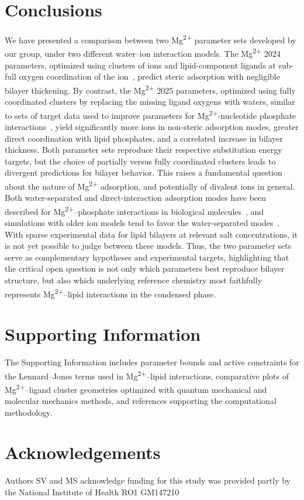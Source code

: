 \documentclass[journal=langd5,manuscript=article]{achemso}
\newcommand{\mg}{Mg\textsuperscript{2+}}
\begin{document}
\section{Conclusions}
We have presented a comparison between
two \mg{} parameter sets developed by our
group, under two different water–ion
interaction models. The \mg{ 2024}
parameters, optimized using clusters of
ions and lipid-component ligands at
sub-full oxygen coordination of the
ion~\cite{saunders:2024}, predict steric
adsorption with negligible bilayer
thickening. By contrast, the \mg{ 2025}
parameters, optimized using fully
coordinated clusters by replacing the
missing ligand oxygens with
waters, similar to sets of target data used to improve parameters for \mg{-nucleotide} phosphate interactions~\cite{julian:2023:mg}, yield
significantly more ions in non-steric
adsorption modes, greater direct
coordination with lipid phosphates, and a
correlated increase in bilayer thickness.
Both parameter sets reproduce their
respective substitution energy targets,
but the choice of partially versus fully
coordinated clusters leads to divergent
predictions for bilayer behavior.
 This raises a fundamental question about the nature of
\mg{} adsorption, and potentially of
divalent ions in general. Both
water-separated and direct-interaction
adsorption modes have been described for
\mg{}–phosphate interactions in biological
molecules~\cite{grotz:thesis,micro,grotz:2021:optimized,
villaparams,dudev:2003,rulivsek:2003:outer,
porschke:1979:mode,bowman:2012,fingerhut:2021:contact},
and simulations with older ion models tend
to favor the water-separated
modes~\cite{grotz:thesis,micro,grotz:2021:optimized,
villaparams,puyo:2022:consistent}. With
sparse experimental data for lipid bilayers
at relevant salt concentrations, it is not
yet possible to judge between these models.
Thus, the two parameter sets serve as
complementary hypotheses and experimental
targets, highlighting that the critical open
question is not only which parameters best
reproduce bilayer structure, but also which
underlying reference chemistry most
faithfully represents \mg{–lipid}
interactions in the condensed phase.

\FloatBarrier
\section{Supporting Information}
The Supporting Information includes parameter bounds and active constraints for the
Lennard--Jones terms used in \mg--lipid interactions, comparative plots of
\mg--ligand cluster geometries optimized with quantum mechanical and molecular
mechanics methods, and references supporting the computational methodology.

\section{Acknowledgements}
Authors SV and MS acknowledge funding for this study was provided partly by the National Institute of Health RO1 GM147210

\newpage
\end{document}
